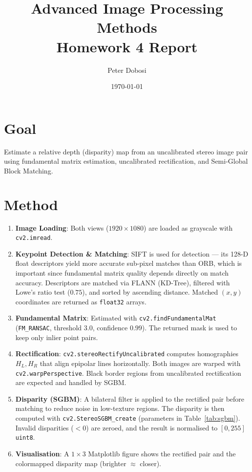 \documentclass[11pt,a4paper]{article}
\title{Advanced Image Processing Methods\\Homework 4 Report}
\author{Peter Dobosi}
\date{\today}
\begin{document}
\maketitle

\section*{Goal}
Estimate a relative depth (disparity) map from an uncalibrated stereo image pair using fundamental matrix estimation, uncalibrated rectification, and Semi-Global Block Matching.

\section*{Method}
\begin{enumerate}[leftmargin=*,itemsep=2pt]
    \item \textbf{Image Loading}: Both views ($1920\times1080$) are loaded as grayscale with \texttt{cv2.imread}.

    \item \textbf{Keypoint Detection \& Matching}: SIFT is used for detection --- its 128-D float descriptors yield more accurate sub-pixel matches than ORB, which is important since fundamental matrix quality depends directly on match accuracy.
    Descriptors are matched via FLANN (KD-Tree), filtered with Lowe's ratio test ($0.75$), and sorted by ascending distance. Matched $(x,y)$ coordinates are returned as \texttt{float32} arrays.

    \item \textbf{Fundamental Matrix}: Estimated with \texttt{cv2.findFundamentalMat} (\texttt{FM\_RANSAC}, threshold $3.0$, confidence $0.99$). The returned mask is used to keep only inlier point pairs.

    \item \textbf{Rectification}: \texttt{cv2.stereoRectifyUncalibrated} computes homographies $H_L, H_R$ that align epipolar lines horizontally. Both images are warped with \texttt{cv2.warpPerspective}. Black border regions from uncalibrated rectification are expected and handled by SGBM.

    \item \textbf{Disparity (SGBM)}: A bilateral filter is applied to the rectified pair before matching to reduce noise in low-texture regions. The disparity is then computed with \texttt{cv2.StereoSGBM\_create} (parameters in Table~\ref{tab:sgbm}). Invalid disparities ($<0$) are zeroed, and the result is normalised to $[0,255]$ \texttt{uint8}.

    \item \textbf{Visualisation}: A $1\times3$ Matplotlib figure shows the rectified pair and the colormapped disparity map (brighter $\approx$ closer).
\end{enumerate}
\end{document}
